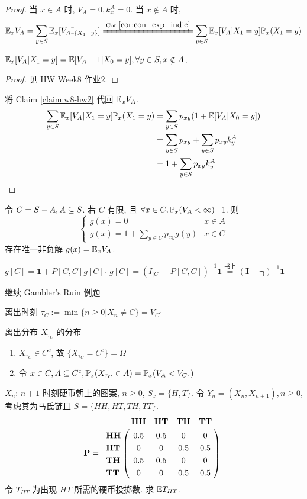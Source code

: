 \begin{proof}
当 $x\in A$ 时, $V_A=0, k_x^A=0$. 当 $x\notin A$ 时,
\[
\EE_x V_A=\sum_{y\in S}\EE_x[V_A\II_{\{X_1=y\}}]\xlongequal{\text{Cor }\eqref{cor:con_exp_indic}}\sum_{y\in S}\EE_x[V_A|X_1=y]\PP_x(X_1=y)
\]
\begin{claim}\label{claim:w8-hw2}
$\mathbb E_x[V_A|X_1=y]=\mathbb E[V_A+1|X_0=y], \forall y\in S, x\notin A$.
\end{claim}
\begin{proof}
见 HW Week8 作业2.
\end{proof}
将 Claim \ref{claim:w8-hw2} 代回 $\mathbb E_x V_A$.
\[
\begin{aligned}
\sum_{y\in S}\mathbb E_x[V_A|X_1=y]\mathbb{P}_x(X_1=y)&=\sum_{y\in S}p_{xy}(1+\mathbb E[V_A|X_0=y])\\
&=\sum_{y\in S}p_{xy}+\sum_{y\in S}p_{xy}k_y^A\\
&=1+\sum_{y\in S}p_{xy}k_y^A
\end{aligned}
\]
\end{proof}

\begin{theorem}\label{thm:p81}
    令 $C=S-A, A\subseteq S$. 若 $C$ 有限, 且 $\forall x\in C, \mathbb{P}_x(V_A<\infty)$=1. 则
    \begin{equation}
    \begin{cases}
        g(x)=0 & x\in A\\
        g(x)=1+\sum_{y\in C}p_{xy}g(y) & x\in C
    \end{cases}
    \end{equation}
    存在唯一非负解 $g(x)=\mathbb E_xV_A$. 
\end{theorem}
$g[C]=\mathbf{1}+P[C,C]g[C]$. $g[C]=(I_{|C|}-P[C,C])^{-1}\mathbf{1}\overset{\text{书上}}{=}(\mathbf{I}-\mathbf{\gamma})^{-1}\mathbf{1}$

继续 Gambler's Ruin 例题

离出时刻 $\tau_C:=\min\{n\geq 0|X_n\neq C\}=V_{C^c}$

离出分布 $X_{\tau_C}$ 的分布
\begin{enumerate}
    \item $X_{\tau_C}\in C^c$, 故 $\{X_{\tau_C}=C^c\}=\Omega$
    \item 令 $x\in C,A\subseteq C^c,\mathbb{P}_x(X_{\tau_C}\in A)=\mathbb{P}_x(V_A<V_{C^c})$
\end{enumerate}

\begin{example}[等待HT出现的时间]\label{exa:1.48}
    $X_n$: $n+1$ 时刻硬币朝上的图案, $n\geq 0$, $S_x=\{H,T\}$. 令 $Y_n=(X_n,X_{n+1}),n\geq 0$, 考虑其为马氏链且 $S=\{HH,HT,TH,TT\}$.
    \begin{align*}
        \mathbf{P}=~
        \bordermatrix{
        &\bf HH&\bf HT&\bf TH&\bf TT \cr
        \bf HH&0.5&0.5&0&0 \cr
        \bf HT&0&0&0.5&0.5 \cr
        \bf TH&0.5&0.5&0&0 \cr
        \bf TT&0&0&0.5&0.5 \cr
        }~
    \end{align*}
    令 $T_{HT}$ 为出现 $HT$ 所需的硬币投掷数. 求 $\mathbb E T_{HT}$.
\end{example}


